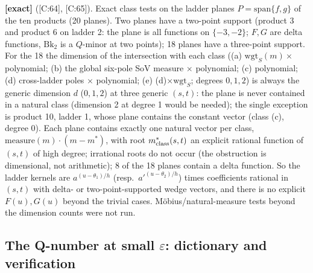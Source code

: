 \documentclass[10pt]{article}
\newcommand{\cl}[2]{\textsf{[#1:#2]}}
\newcommand{\tg}[1]{\textbf{[#1]}}
\newcommand{\Bk}{\mathrm{Bk}_2}
\begin{document}
\tg{exact} (\cl{C}{64}, \cl{C}{65}). Exact class tests on the ladder planes $P=\mathrm{span}\{f,g\}$ of the ten products (20 planes). Two planes have a two-point support (product 3 and product 6 on ladder 2: the plane is all functions on $\{-3,-2\}$; $F,G$ are delta functions, $\Bk$ is a $Q$-minor at two points); 18 planes have a three-point support. For the 18 the dimension of the intersection with each class ((a) $\mathrm{wgt}_S(m)\times$ polynomial; (b) the global six-pole SoV measure $\times$ polynomial; (c) polynomial; (d) cross-ladder poles $\times$ polynomial; (e) (d)$\times\mathrm{wgt}_S$; degrees $0,1,2$) is always the generic dimension $d$ ($0,1,2$) at three generic $(s,t)$: the plane is never contained in a natural class (dimension 2 at degree 1 would be needed); the single exception is product 10, ladder 1, whose plane contains the constant vector (class (c), degree 0). Each plane contains exactly one natural vector per class, $\mathrm{measure}(m)\cdot(m-m^\ast)$, with root $m^\ast_{\rm class}(s,t)$ an explicit rational function of $(s,t)$ of high degree; irrational roots do not occur (the obstruction is dimensional, not arithmetic); 8 of the 18 planes contain a delta function. So the ladder kernels are $a^{(u-\theta_1)/h}$ (resp.\ $a'^{(u-\theta_2)/h}$) times coefficients rational in $(s,t)$ with delta- or two-point-supported wedge vectors, and there is no explicit $F(u),G(u)$ beyond the trivial cases. M\"obius/natural-measure tests beyond the dimension counts were not run.

\subsection{The Q-number at small $\varepsilon$: dictionary and verification}\label{sec:CQ}
\end{document}
